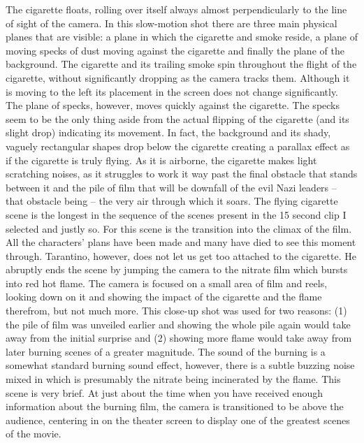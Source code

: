 \documentclass[12pt]{article}
\begin{document}
\begin{flushleft}
The cigarette floats, rolling over itself always almost perpendicularly to the line of sight of the camera. In this slow-motion shot there are three main physical planes that are visible: a plane in which the cigarette and smoke reside, a plane of moving specks of dust moving against the cigarette and finally the plane of the background. The cigarette and its trailing smoke spin throughout the flight of the cigarette, without significantly dropping as the camera tracks them. Although it is moving to the left its placement in the screen does not change significantly. The plane of specks, however, moves quickly against the cigarette. The specks seem to be the only thing aside from the actual flipping of the cigarette (and its slight drop) indicating its movement. In fact, the background and its shady, vaguely rectangular shapes drop below the cigarette creating a parallax effect as if the cigarette is truly flying.
                                    As it is airborne, the cigarette makes light scratching noises, as it struggles to work it way past the final obstacle that stands between it and the pile of film that will be downfall of the evil Nazi leaders – that obstacle being – the very air through which it soars.
                                        The flying cigarette scene is the longest in the sequence of the scenes present in the 15 second clip I selected and justly so. For this scene is the transition into the climax of the film. All the characters' plans have been made and many have died to see this moment through.
                                            Tarantino, however, does not let us get too attached to the cigarette. He abruptly ends the scene by jumping the camera to the nitrate film which bursts into red hot flame. The camera is focused on a small area of film and reels, looking down on it and showing the impact of the cigarette and the flame therefrom, but not much more. This close-up shot was used for two reasons: (1) the pile of film was unveiled earlier and showing the whole pile again would take away from the initial surprise and (2) showing more flame would take away from later burning scenes of a greater magnitude. The sound of the burning is a somewhat standard burning sound effect, however, there is a subtle buzzing noise mixed in which is presumably the nitrate being incinerated by the flame. This scene is very brief. At just about the time when you have received enough information about the burning film, the camera is transitioned to be above the audience, centering in on the theater screen to display one of the greatest scenes of the movie.

\end{flushleft}
\end{document}
